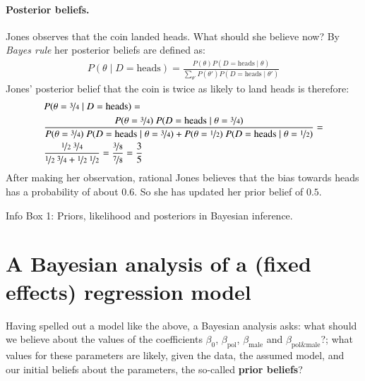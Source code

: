 \documentclass[nobib]{tufte-handout}
\begin{document}
\begin{InfoBox}[]
{\begin{minipage}{1.0\textwidth}
    \paragraph{Posterior beliefs.} Jones observes that the coin landed heads. What should she
    believe now? By \emph{Bayes rule} her posterior beliefs are defined as:
    \begin{align*}
      P(\theta \mid D = \text{heads}) = \frac{P(\theta) P(D = \text{heads} \mid \theta)}{\sum_{\theta'}P(\theta') P(D = \text{heads} \mid \theta')}
    \end{align*}
    Jones' posterior belief that the coin is twice as likely to land heads is therefore:
    \begin{align*}
      & P(\theta = \nicefrac{3}{4} \mid D = \text{heads}) =  \\
      & \frac{P(\theta = \nicefrac{3}{4}) \ P(D = \text{heads} \mid \theta = \nicefrac{3}{4})}{P(\theta = \nicefrac{3}{4}) \ P(D = \text{heads} \mid \theta = \nicefrac{3}{4}) + P(\theta = \nicefrac{1}{2}) \ P(D = \text{heads} \mid \theta = \nicefrac{1}{2})} = \\
      & \frac{\nicefrac{1}{2} \ \nicefrac{3}{4}}{\nicefrac{1}{2} \ \nicefrac{3}{4} + \nicefrac{1}{2} \ \nicefrac{1}{2}} = \frac{\nicefrac{3}{8}}{\nicefrac{7}{8}} = \frac{3}{5} 
    \end{align*}
    After making her observation, rational Jones believes that the bias towards heads has a
    probability of about $0.6$. So she has updated her prior belief of $0.5$.
    
  \end{minipage} \par
  } \par
  \begin{center}
    Info Box 1: Priors, likelihood and posteriors in Bayesian inference.
  \end{center}
\end{InfoBox}


\section{A Bayesian analysis of a (fixed effects) regression model}

Having spelled out a model like the above, a Bayesian analysis asks: what should we
believe about the values of the coefficients $\beta_0$, $\beta_{\text{pol}}$,
$\beta_{\text{male}}$ and $\beta_{\text{pol\&male}}$?; what values for these parameters are
likely, given the data, the assumed model, and our initial beliefs about the parameters, the
so-called \textbf{prior beliefs}?
%
%
%
\end{document}
